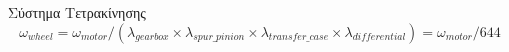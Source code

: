 \documentclass[10pt, compress]{beamer}
\begin{document}
\begin{frame}{Σύστημα Τετρακίνησης}
	\begin{equation*}
	\omega_{wheel} = \omega_{motor} / (\lambda_{gearbox} \times \lambda_{spur\_pinion} \times \lambda_{transfer\_case} \times \lambda_{differential}) = \omega_{motor} / 644
	\end{equation*}\\[-0.3cm]
	\begin{figure}
		\centering
		\\[0.15cm]
		\hspace{0.5cm}
		\hspace{0.5cm}
	\end{figure}
\end{frame}
\end{document}
